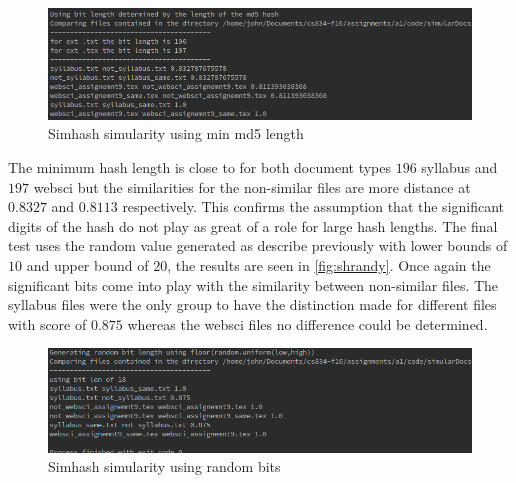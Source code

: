 \documentclass[11pt]{article}
\newenvironment{code}{\captionsetup{type=listing}}{}
\begin{document}
\begin{figure}[h]
\centering
	\includegraphics[scale=0.6]{simhashMD5.png}
	\caption{Simhash simularity using min md5 length} \label{fig:shmd5}
\end{figure}\newline
The minimum hash length is close to for both document types $196$ syllabus and $197$ websci but the similarities for the non-similar files are more distance at $0.8327$ and $0.8113$ respectively. This confirms the assumption that the significant digits of the hash do not play as great of a role for large hash lengths.
The final test uses the random value generated as describe previously with lower bounds of $10$ and upper bound of $20$, the results are seen in \autoref{fig:shrandy}. Once again the significant bits come into play with the similarity between non-similar files. The syllabus files were the only group to have the distinction made for different files with score of $0.875$ whereas the websci files no difference could be determined.
\begin{figure}[h]
\centering
	\includegraphics[scale=0.6]{randBits.png}
	\caption{Simhash simularity using random bits} \label{fig:shrandy}
\end{figure}\newline
\begin{code}
	\label{code:simhash}
\end{code}
\newpage
\clearpage

\end{document}
